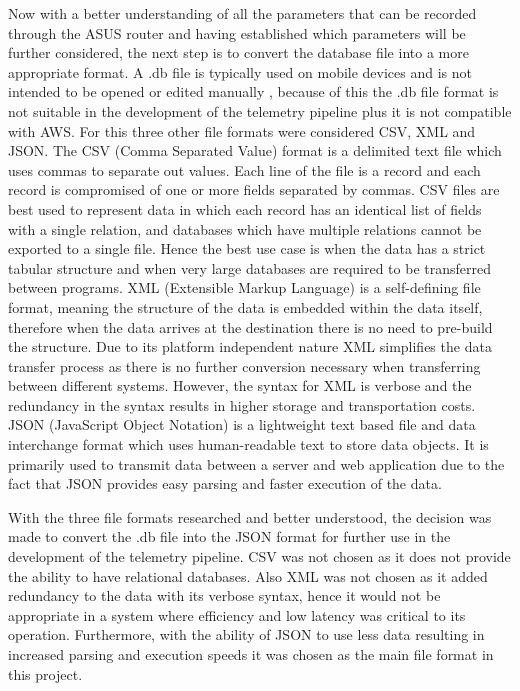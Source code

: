 Now with a better understanding of all the parameters that can be recorded through the ASUS router and having established which parameters will be further considered, the next step is to convert the database file into a more appropriate format. A .db file is typically used on mobile devices and is not intended to be opened or edited manually \cite{dbFiles}, because of this the .db file format is not suitable in the development of the telemetry pipeline plus it is not compatible with AWS. For this three other file formats were considered CSV, XML and JSON. The CSV (Comma Separated Value) format is a delimited text file which uses commas to separate out values. Each line of the file is a record and each record is compromised of one or more fields separated by commas. CSV files are best used to represent data in which each record has an identical list of fields with a single relation, and databases which have multiple relations cannot be exported to a single file. Hence the best use case is when the data has a strict tabular structure and when very large databases are required to be transferred between programs. XML (Extensible Markup Language) is a self-defining file format, meaning the structure of the data is embedded within the data itself, therefore when the data arrives at the destination there is no need to pre-build the structure. Due to its platform independent nature XML simplifies the data transfer process as there is no further conversion necessary when transferring between different systems. However, the syntax for XML is verbose and the redundancy in the syntax results in higher storage and transportation costs. JSON (JavaScript Object Notation) is a lightweight text based file and data interchange format which uses human-readable text to store data objects. It is primarily used to transmit data between a server and web application due to the fact that JSON provides easy parsing and faster execution of the data. 

With the three file formats researched and better understood, the decision was made to convert the .db file into the JSON format for further use in the development of the telemetry pipeline. CSV was not chosen as it does not provide the ability to have relational databases. Also XML was not chosen as it added redundancy to the data with its verbose syntax, hence it would not be appropriate in a system where efficiency and low latency was critical to its operation. Furthermore, with the ability of JSON to use less data resulting in increased parsing and execution speeds it was chosen as the main file format in this project. 


